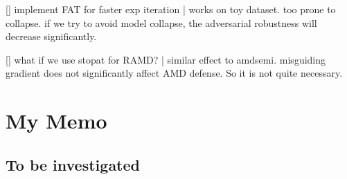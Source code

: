 	 [\cmark] implement FAT for faster exp iteration | works on toy
		dataset. too prone to collapse. if we try to avoid model collapse, the
		adversarial robustness will decrease significantly.

	 [\cmark] what if we use stopat for RAMD? | similar effect to amdsemi.
		misguiding gradient does not significantly affect AMD defense. So it
		is not quite necessary.
	




\begin{comment}
\section{Visualizations}
Visualize robustness through the image retrieval task.
\end{comment}


\section{My Memo}

\subsection{To be investigated}

